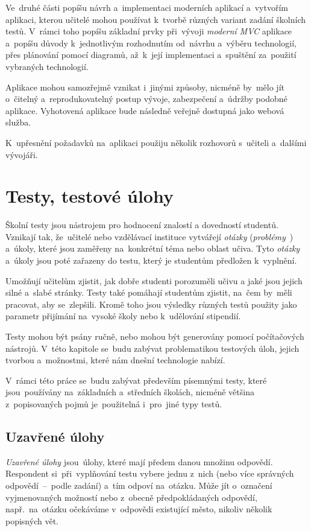 \documentclass[10pt,a4paper]{article}
\begin{document}
        Ve~druhé části popíšu návrh a~implementaci moderních aplikací a~vytvořím aplikaci, kterou učitelé mohou používat k~tvorbě různých variant zadání školních testů. V~rámci toho popíšu základní prvky při~vývoji \emph{moderní \emph{MVC}} aplikace a~popíšu důvody k~jednotlivým rozhodnutím od~návrhu a~výběru technologií, přes plánování pomocí diagramů, až~k~její implementaci a~spuštění za~použití vybraných technologií.
        
        Aplikace mohou samozřejmě vznikat i~jinými způsoby, nicméně by~mělo jít o~čitelný a~reprodukovatelný postup vývoje, zabezpečení a~údržby podobné aplikace. Vyhotovená aplikace bude následně veřejně dostupná jako webová služba.

        K~upřesnění požadavků na~aplikaci použiju několik rozhovorů s~učiteli a~dalšími vývojáři.

    \section{Testy, testové úlohy}
        Školní testy jsou nástrojem pro hodnocení znalostí a dovedností studentů. Vznikají tak, že~učitelé nebo vzdělávací instituce vytvářejí \emph{otázky} (\emph{problémy}~\cite{zhouf:tvorbamatproblemu}) a~úkoly, které jsou zaměřeny na~konkrétní téma nebo oblast učiva. Tyto \emph{otázky} a~úkoly jsou poté zařazeny do testu, který je studentům předložen k~vyplnění.

        Umožňují učitelům zjistit, jak dobře studenti porozuměli učivu a jaké jsou jejich silné a~slabé stránky. Testy také pomáhají studentům zjistit, na~čem by~měli pracovat, aby se~zlepšili. Kromě toho jsou výsledky různých testů použity jako parametr přijímání na~vysoké školy nebo k~udělování stipendií.
        
        Testy mohou být psány ručně, nebo mohou být generovány pomocí počítačových nástrojů. V~této kapitole se~budu zabývat problematikou testových úloh, jejich tvorbou a~možnostmi, které nám dnešní technologie nabízí.

        V~rámci této práce se~budu zabývat především písemnými testy, které jsou~používány na~základních a~středních školách, nicméně většina z~popisovaných pojmů je~použitelná i~pro~jiné typy testů.

        \subsection{Uzavřené úlohy}
            \emph{Uzavřené úlohy} jsou~úlohy, které mají předem danou množinu odpovědí. Respondent si~při~vyplňování testu vybere jednu z~nich (nebo více správných odpovědí~--~podle zadání) a~tím odpoví na~otázku. Může jít o~označení vyjmenovaných možností nebo z~obecně předpokládaných odpovědí, např.~na~otázku  očekáváme v~odpovědi existující město, nikoliv několik popisných vět.
\end{document}
